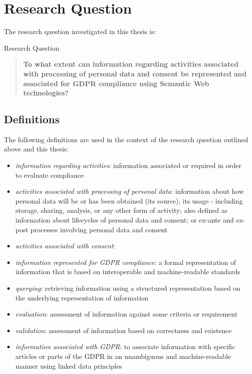 \section{Research Question}
The research question investigated in this thesis is:
\begin{framed}
\small{Research Question}
\begin{quote}
\textbf{To what extent can information regarding activities associated with processing of personal data and consent be represented and associated for GDPR compliance using Semantic Web technologies?}
\end{quote}
\end{framed}

\subsection{Definitions}
The following definitions are used in the context of the research question outlined above and this thesis:
\begin{itemize}
    \item \textit{information regarding activities}: information associated or required in order to evaluate compliance
    \item \textit{activities associated with processing of personal data}: information about how personal data  will be or has been obtained (its source), its usage - including storage, sharing, analysis, or any other form of activity; also defined as information about lifecycles of personal data and consent; or ex-ante and ex-post processes involving personal data and consent
    \item \textit{activities associated with consent}:
    \item \textit{information represented for GDPR compliance}: a formal representation of information that is based on interoperable and machine-readable standards
    \item \textit{querying}: retrieving information using a structured representation based on the underlying representation of information
    \item \textit{evaluation}: assessment of information against some criteria or requirement
    \item \textit{validation}: assessment of information based on correctness and existence
    \item \textit{information associated with GDPR}: to associate information with specific articles or parts of the GDPR in an unambiguous and machine-readable manner using linked data principles
\end{itemize}

